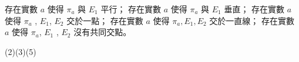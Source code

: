 \begin{QUESTIONS}
\begin{QUESTION}
\begin{QBODY}
            \begin{QOPS} 
                \QOP 存在實數 $a$ 使得 $\pi_a$ 與 $E_1$ 平行；
                \QOP 存在實數 $a$ 使得 $\pi_a$ 與 $E_1$ 垂直；
                \QOP 存在實數 $a$ 使得 $\pi_a$ , $E_1$, $E_2$ 交於一點； 
                \QOP 存在實數 $a$ 使得 $\pi_a, E_1, E_2 $ 交於一直線；
                \QOP 存在實數 $a$ 使得 $\pi_a$, $E_1$ , $E_2$ 沒有共同交點。\end{QOPS}
        \end{QBODY}
        \begin{QFROMS}
        \end{QFROMS}
        \begin{QTAGS}\end{QTAGS}
        \begin{QANS}
            (2)(3)(5)
        \end{QANS}
        \begin{QSOLLIST}
        \end{QSOLLIST}
        \begin{QEMPTYSPACE}
        \end{QEMPTYSPACE}
    \end{QUESTION}
\end{QUESTIONS}
